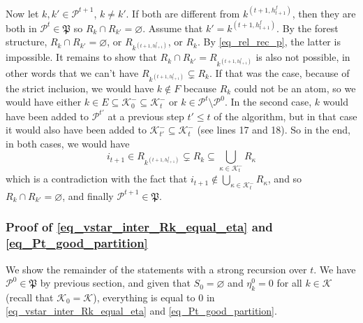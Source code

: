 \documentclass[
  11pt,
  a4paper,
]{article}
\theoremstyle{definition}
\theoremstyle{plain}
\theoremstyle{plain}
\theoremstyle{plain}
\theoremstyle{definition}
\theoremstyle{remark}
\begin{document}
Now let \(k,k'\in\mathcal{P}^{t+1}\), \(k\neq k'\). If both are
different from \(k^{(t+1,h^f_{t+1})}\), then they are both in
\(\mathcal{P}^t\in\mathfrak P\) so \(R_k\cap R_{k'}=\varnothing\).
Assume that \(k'=k^{(t+1,h^f_{t+1})}\). By the forest structure,
\(R_k\cap R_{k'}=\varnothing\), or \(R_{k^{(t+1,h^f_{t+1})}}\), or
\(R_k\). By \eqref{eq_rel_rec_p}, the latter is impossible. It remains
to show that \(R_k\cap R_{k'}=R_{  k^{(t+1,h^f_{t+1})}}\) is also not
possible, in other words that we can't have
\(R_{  k^{(t+1,h^f_{t+1})}} \subsetneq  R_{k}\). If that was the case,
because of the strict inclusion, we would have \(k\not\in F\) because
\(R_{k}\) could not be an atom, so we would have either
\(k\in E\subseteq \mathcal{K}^-_0 \subseteq \mathcal{K}^-_t\) or
\(k\in\mathcal{P}^t\setminus\mathcal{P}^0\). In the second case, \(k\)
would have been added to \(\mathcal{P}^{t'}\) at a previous step
\(t'\leq t\) of the algorithm, but in that case it would also have been
added to \(\mathcal{K}_{t'}^-\subseteq \mathcal{K}_{t}^-\) (see lines 17
and 18). So in the end, in both cases, we would have \begin{equation*}
i_{t+1}\in R_{  k^{(t+1,h^f_{t+1})}}  \subsetneq  R_{k} \subseteq \bigcup_{\kappa\in\mathcal{K}^-_{t}}R_{\kappa}
\end{equation*} which is a contradiction with the fact that
\(i_{t+1}\not\in\bigcup_{\kappa \in \mathcal{K}^-_t} R_{\kappa}\), and
so \(R_k\cap R_{k'}=\varnothing\), and finally
\(\mathcal{P}^{t+1}\in\mathfrak P\).

\subsubsection{\texorpdfstring{Proof of
\eqref{eq_vstar_inter_Rk_equal_eta} and
\eqref{eq_Pt_good_partition}}{Proof of  and }}\label{proof-of-and}

We show the remainder of the statements with a strong recursion over
\(t\). We have \(\mathcal{P}^0\in\mathfrak P\) by previous section, and
given that \(S_0=\varnothing\) and \(\eta^0_k=0\) for all
\(k\in\mathcal{K}\) (recall that \(\mathcal{K}_0=\mathcal{K}\)),
everything is equal to 0 in \eqref{eq_vstar_inter_Rk_equal_eta} and
\eqref{eq_Pt_good_partition}.
\end{document}
